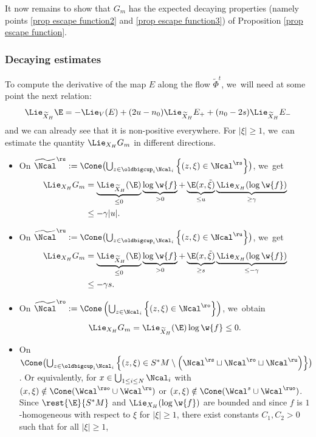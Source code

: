 It now remains to show that $G_m$ has the expected decaying properties (namely points \eqref{prop escape function2} and \eqref{prop escape function3}) of Proposition \ref{prop escape function}.

\subsubsection*{Decaying estimates}
To compute the derivative of the map $E$ along the flow $\widetilde{\Phi}^t$, we~will need at some point the next relation:
\[
\Lie_{\widetilde{X}_H} \E = - \Lie_V (E) + (2u - n_0) \Lie_{\widetilde{X}_H} E_+ + (n_0 -2s) \Lie_{\widetilde{X}_H} E_-
\]
and we can already see that it is non-positive everywhere. For $|\xi| \geq 1$, we~can estimate the quantity $\Lie_{X_H} G_m$ in different directions.
\begin{itemize}
\item On $\widetilde{\Ncal}^\rs:= \Cone \bigl(\bigcup_{z \in \oldbigcup_i \Ncal_i} \left\{ (z,\xi) \in \Ncal^\rs \right\} \bigr)$, we~get
\begin{align*}
\Lie_{X_H} G_m &= \underbrace{\Lie_{\widetilde{X}_H} (\E)}_{\leq 0} \underbrace{\log \w{f}}_{> 0} + \underbrace{\E (x,\tilde{\xi})}_{\leq u } \underbrace{\Lie_{X_H} (\log \w{f})}_{\geq \gamma} \\
&\leq - \gamma |u|.
\end{align*}
\item On $\widetilde{\Ncal}^\ru:= \Cone \bigl(\bigcup_{z \in \oldbigcup_i \Ncal_i} \left\{ (z,\xi) \in \Ncal^\ru \right\} \bigr)$, we~get
\begin{align*}
\Lie_{X_H} G_m &= \underbrace{\Lie_{\widetilde{X}_H} (\E)}_{\leq 0} \underbrace{\log \w{f}}_{> 0} + \underbrace{\E (x,\tilde{\xi})}_{\geq s} \underbrace{\Lie_{X_H} (\log \w{f})}_{\leq - \gamma} \\
&\leq - \gamma s.
\end{align*}
\item On $\widetilde{\Ncal}^\ro:= \Cone \left(\bigcup_{z \in \Ncal_i} \left\{ (z,\xi) \in \Ncal^\ro \right\}\right)$, we~obtain
\[
\Lie_{X_H} G_m = \Lie_{\widetilde{X}_H} (\E) \log \w{f} \leq 0.
\]
\item On $\Cone \bigl(\bigcup_{z \in \oldbigcup_i \Ncal_i} \left\{ (z,\xi) \in S^* M \setminus \left(\Ncal^\rs \sqcup \Ncal^\ro \sqcup \Ncal^\ru \right) \right\} \bigr)$. Or equivalently, for $x \in \bigcup_{1 \leq i \leq N} \Ncal_i$ with $(x,\xi) \notin \Cone (\Wcal^{\rso}\cup \Wcal^{\ru})$ or $(x,\xi) \notin \Cone (\Wcal^{s}\cup \Wcal^{\ruo})$. Since $\rest{\E}{S^* M}$ and $\Lie_{X_H} (\log \w{f})$ are bounded and since $f$ is $1$-homogeneous with respect to $\xi$ for $|\xi| \geq 1$, there exist constants $C_1, C_2 > 0$ such that for all $|\xi| \geq 1$,

\end{itemize}
